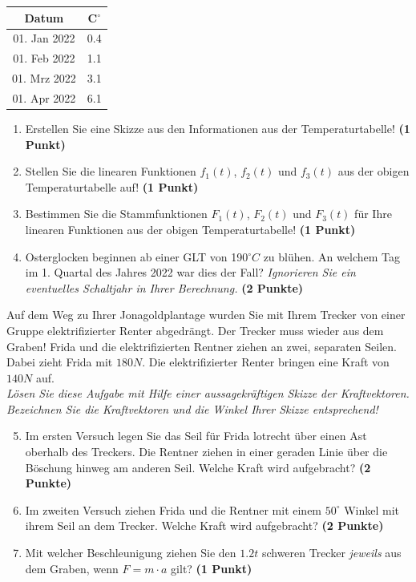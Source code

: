 \documentclass[a4paper, 10pt]{scrartcl}\usepackage[]{graphicx}\usepackage[]{xcolor}
\begin{document}
\begin{center}
\begin{tabular}{cc}
  \toprule
  Datum & C$^\circ$ \\
  \midrule
  01. Jan 2022 & 0.4\\
  01. Feb 2022 & 1.1\\
  01. Mrz 2022 & 3.1\\
  01. Apr 2022 & 6.1\\
  \bottomrule
\end{tabular}
\end{center}

\begin{enumerate}
\item Erstellen Sie eine Skizze aus den Informationen aus der
  Temperaturtabelle!  \textbf{(1 Punkt)}
\item Stellen Sie die linearen Funktionen $f_1(t)$, $f_2(t)$ und
  $f_3(t)$ aus der obigen Temperaturtabelle auf!  \textbf{(1 Punkt)}
\item Bestimmen Sie die Stammfunktionen $F_1(t)$, $F_2(t)$ und $F_3(t)$ f{\"u}r
  Ihre linearen Funktionen aus der obigen Temperaturtabelle!  \textbf{(1
    Punkt)}
\item Osterglocken beginnen ab einer GLT von 190$^\circ C$ zu bl{\"u}hen. An
  welchem Tag im 1. Quartal des Jahres 2022 war dies der
  Fall? \textit{Ignorieren Sie ein eventuelles Schaltjahr in Ihrer Berechnung.} \textbf{(2 Punkte)}
\end{enumerate}

Auf dem Weg zu Ihrer Jonagoldplantage wurden Sie mit Ihrem Trecker von
einer Gruppe elektrifizierter Renter abgedr{\"a}ngt. Der Trecker muss wieder
aus dem Graben! Frida und die elektrifizierten Rentner ziehen an zwei,
separaten Seilen. Dabei zieht Frida mit $180N$. Die
elektrifizierter Renter  bringen eine Kraft von $140N$ auf.\\

\textit{L{\"o}sen Sie diese Aufgabe mit Hilfe einer aussagekr{\"a}ftigen Skizze der
  Kraftvektoren. Bezeichnen Sie die Kraftvektoren und die Winkel Ihrer
  Skizze entsprechend!}

\begin{enumerate}
  \setcounter{enumi}{4}  
\item Im ersten Versuch legen Sie das Seil f{\"u}r Frida lotrecht {\"u}ber einen
  Ast oberhalb des Treckers. Die Rentner ziehen in einer geraden Linie {\"u}ber
  die B{\"o}schung hinweg am anderen Seil. Welche Kraft wird aufgebracht?
  \textbf{(2 Punkte)}
\item Im zweiten Versuch ziehen Frida und die Rentner mit einem
  $50^\circ$ Winkel mit ihrem Seil an dem Trecker. Welche Kraft
  wird aufgebracht? \textbf{(2 Punkte)}
\item Mit welcher Beschleunigung ziehen Sie den $1.2t$ schweren
  Trecker \textit{jeweils} aus dem Graben, wenn $F = m \cdot a$ gilt?
  \textbf{(1 Punkt)}
\end{enumerate}
\end{document}
